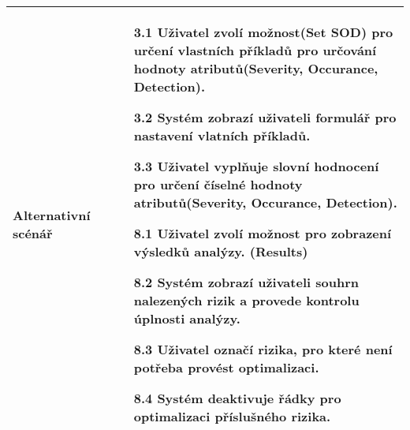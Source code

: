 \begin{longtable}{p{4cm} | p{12cm} }
Alternativní scénář  &
\begin{itemize}
    \item [3.1] Uživatel zvolí možnost(Set SOD) pro určení vlastních příkladů pro určování hodnoty atributů(Severity, Occurance, Detection).
    \item [3.2] Systém zobrazí uživateli formulář pro nastavení vlatních příkladů.
    \item [3.3] Uživatel vyplňuje slovní hodnocení pro určení číselné hodnoty atributů(Severity, Occurance, Detection).
\end{itemize}
\begin{itemize}
    \item [8.1] Uživatel zvolí možnost pro zobrazení výsledků analýzy. (Results)
    \item [8.2] Systém zobrazí uživateli souhrn nalezených rizik a provede kontrolu úplnosti analýzy.
    \item [8.3] Uživatel označí rizika, pro které není potřeba provést optimalizaci.  
    \item [8.4] Systém deaktivuje řádky pro optimalizaci příslušného rizika.
\end{itemize}
\\ \hline

\end{longtable}



